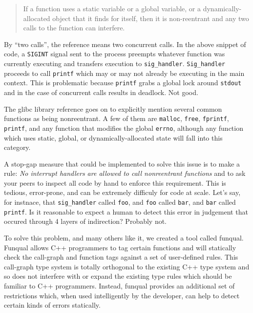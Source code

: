 \begin{quote}
    If a function uses a static variable or a global variable, or a dynamically-allocated object that it finds for itself, then it is non-reentrant and any two calls to the function can interfere.
\end{quote}

By ``two calls'', the reference means two concurrent calls.  In the above snippet of code, a \lstinline{SIGINT} signal sent to the process preempts whatever function was currently executing and transfers execution to \lstinline{sig_handler}.  \lstinline{Sig_handler} proceeds to call \lstinline{printf} which may or may not already be executing in the main context.  This is problematic because \lstinline{printf} grabs a global lock around \lstinline{stdout} and in the case of concurrent calls results in deadlock.  Not good.

The glibc library reference goes on to explicitly mention several common functions as being nonreentrant.  A few of them are \lstinline{malloc}, \lstinline{free}, \lstinline{fprintf}, \lstinline{printf}, and any function that modifies the global \lstinline{errno}, although any function which uses static, global, or dynamically-allocated state will fall into this category.  

A stop-gap measure that could be implemented to solve this issue is to make a rule: \textit{No interrupt handlers are allowed to call nonreentrant functions} and to ask your peers to inspect all code by hand to enforce this requirement.  This is tedious, error-prone, and can be extremely difficuly for code at scale.  Let's say, for instnace, that \lstinline{sig_handler} called \lstinline{foo}, and \lstinline{foo} called \lstinline{bar}, and \lstinline{bar} called \lstinline{printf}.  Is it reasonable to expect a human to detect this error in judgement that occured through 4 layers of indirection?  Probably not.

To solve this problem, and many others like it, we created a tool called funqual.  Funqual allows C++ programmers to tag certain functions and will statically check the call-graph and function tags against a set of user-defined rules.  This call-graph type system is totally orthogonal to the existing C++ type system and so does not interfere with or expand the existing type rules which should be familiar to C++ programmers.  Instead, funqual provides an additional set of restrictions which, when used intelligently by the developer, can help to detect certain kinds of errors statically.

